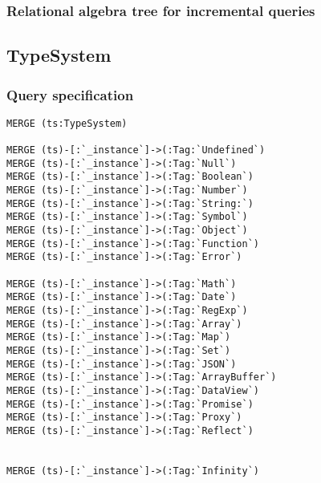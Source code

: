 \subsubsection*{Relational algebra tree for incremental queries}

\subsection{TypeSystem}

\subsubsection*{Query specification}

\begin{lstlisting}
MERGE (ts:TypeSystem)

MERGE (ts)-[:`_instance`]->(:Tag:`Undefined`)
MERGE (ts)-[:`_instance`]->(:Tag:`Null`)
MERGE (ts)-[:`_instance`]->(:Tag:`Boolean`)
MERGE (ts)-[:`_instance`]->(:Tag:`Number`)
MERGE (ts)-[:`_instance`]->(:Tag:`String:`)
MERGE (ts)-[:`_instance`]->(:Tag:`Symbol`)
MERGE (ts)-[:`_instance`]->(:Tag:`Object`)
MERGE (ts)-[:`_instance`]->(:Tag:`Function`)
MERGE (ts)-[:`_instance`]->(:Tag:`Error`)

MERGE (ts)-[:`_instance`]->(:Tag:`Math`)
MERGE (ts)-[:`_instance`]->(:Tag:`Date`)
MERGE (ts)-[:`_instance`]->(:Tag:`RegExp`)
MERGE (ts)-[:`_instance`]->(:Tag:`Array`)
MERGE (ts)-[:`_instance`]->(:Tag:`Map`)
MERGE (ts)-[:`_instance`]->(:Tag:`Set`)
MERGE (ts)-[:`_instance`]->(:Tag:`JSON`)
MERGE (ts)-[:`_instance`]->(:Tag:`ArrayBuffer`)
MERGE (ts)-[:`_instance`]->(:Tag:`DataView`)
MERGE (ts)-[:`_instance`]->(:Tag:`Promise`)
MERGE (ts)-[:`_instance`]->(:Tag:`Proxy`)
MERGE (ts)-[:`_instance`]->(:Tag:`Reflect`)


MERGE (ts)-[:`_instance`]->(:Tag:`Infinity`)
\end{lstlisting}

